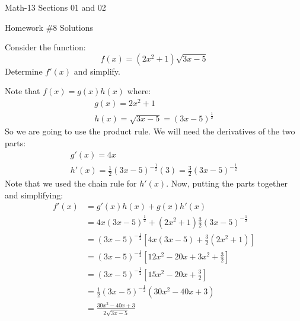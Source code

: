 \documentclass[letterpaper,12pt,fleqn]{article}
\begin{document}
\begin{center}
  \large
  Math-13 Sections 01 and 02

  \Large
  Homework \#8 Solutions
\end{center}

\vspace{0.5in}

Consider the function:
\[f(x)=(2x^2+1)\sqrt{3x-5}\]
Determine \(f'(x)\) and simplify.

Note that \(f(x)=g(x)h(x)\) where:
\begin{gather*}
  g(x)=2x^2+1 \\
  h(x)=\sqrt{3x-5}=(3x-5)^{\frac{1}{2}}
\end{gather*}
So we are going to use the product rule.  We will need the derivatives of the two parts:
\begin{gather*}
  g'(x)=4x \\
  h'(x)=\frac{1}{2}(3x-5)^{-\frac{1}{2}}(3)=\frac{3}{2}(3x-5)^{-\frac{1}{2}}
\end{gather*}
Note that we used the chain rule for \(h'(x)\).  Now, putting the parts together and simplifying:
\begin{align*}
  f'(x) &= g'(x)h(x)+g(x)h'(x) \\
  &= 4x(3x-5)^{\frac{1}{2}}+(2x^2+1)\frac{3}{2}(3x-5)^{-\frac{1}{2}} \\
  &= (3x-5)^{-\frac{1}{2}}\left[4x(3x-5)+\frac{3}{2}(2x^2+1)\right] \\
  &= (3x-5)^{-\frac{1}{2}}\left[12x^2-20x+3x^2+\frac{3}{2}\right] \\
  &= (3x-5)^{-\frac{1}{2}}\left[15x^2-20x+\frac{3}{2}\right] \\
  &= \frac{1}{2}(3x-5)^{-\frac{1}{2}}(30x^2-40x+3) \\
  &= \frac{30x^2-40x+3}{2\sqrt{3x-5}}
\end{align*}
\end{document}
